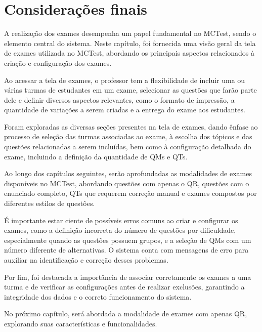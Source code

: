 \section{Considerações finais}

A realização dos exames desempenha um papel fundamental no MCTest, sendo o elemento central do sistema. Neste capítulo, foi fornecida uma visão geral da tela de exames utilizada no MCTest, abordando os principais aspectos relacionados à criação e configuração dos exames.

Ao acessar a tela de exames, o professor tem a flexibilidade de incluir uma ou várias turmas de estudantes em um exame, selecionar as questões que farão parte dele e definir diversos aspectos relevantes, como o formato de impressão, a quantidade de variações a serem criadas e a entrega do exame aos estudantes.

Foram exploradas as diversas seções presentes na tela de exames, dando ênfase ao processo de seleção das turmas associadas ao exame, à escolha dos tópicos e das questões relacionadas a serem incluídas, bem como à configuração detalhada do exame, incluindo a definição da quantidade de QMs e QTs.

Ao longo dos capítulos seguintes, serão aprofundadas as modalidades de exames disponíveis no MCTest, abordando questões com apenas o QR, questões com o enunciado completo, QTs que requerem correção manual e exames compostos por diferentes estilos de questões.

É importante estar ciente de possíveis erros comuns ao criar e configurar os exames, como a definição incorreta do número de questões por dificuldade, especialmente quando as questões possuem grupos, e a seleção de QMs com um número diferente de alternativas. O sistema conta com mensagens de erro para auxiliar na identificação e correção desses problemas.

Por fim, foi destacada a importância de associar corretamente os exames a uma turma e de verificar as configurações antes de realizar exclusões, garantindo a integridade dos dados e o correto funcionamento do sistema.

No próximo capítulo, será abordada a modalidade de exames com apenas QR, explorando suas características e funcionalidades.